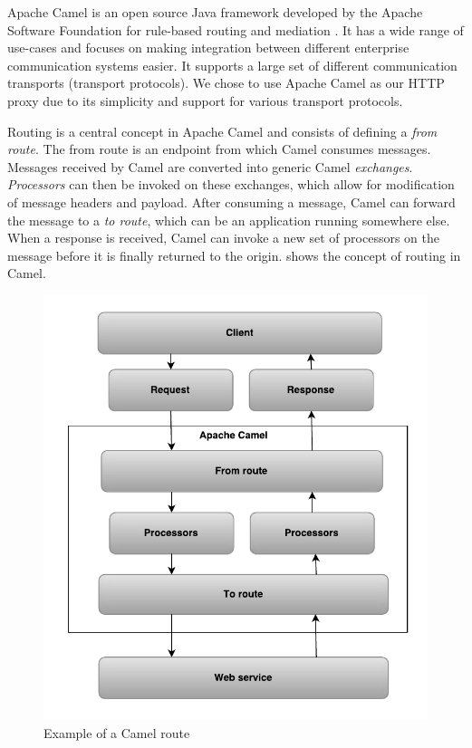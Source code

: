 Apache Camel is an open source Java framework developed by the Apache Software
Foundation for rule-based routing and mediation \cite{camel-homepage}. It has a
wide range of use-cases and focuses on making integration between different
enterprise communication systems easier. It supports a large set of different
communication transports (transport protocols). We chose to use Apache Camel as
our HTTP proxy due to its simplicity and support for various transport
protocols.

Routing is a central concept in Apache Camel and consists of defining a
\textit{from route}. The from route is an endpoint from which Camel consumes
messages. Messages received by Camel are converted into generic Camel
\textit{exchanges}. \textit{Processors} can then be invoked on these exchanges,
which allow for modification of message headers and payload. After consuming a
message, Camel can forward the message to a \textit{to route}, which can be an
application running somewhere else. When a response is received, Camel can
invoke a new set of processors on the message before it is finally returned to
the origin.  shows the concept of routing in Camel.

\begin{figure}[h]
\centering
\includegraphics[scale=0.4]{images/camel_routes.png}
\caption{Example of a Camel route}
\label{figure:camel-route}
\end{figure}

